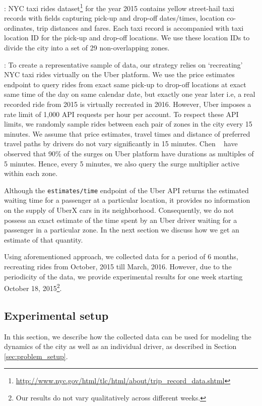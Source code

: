 :
NYC taxi rides dataset\footnote{\url{http://www.nyc.gov/html/tlc/html/about/trip_record_data.shtml}} for the year 2015 contains yellow street-hail taxi records with fields capturing pick-up and drop-off dates/times, location co-ordinates, trip distances and fares. Each taxi record is accompanied with taxi location ID for the pick-up and drop-off locations. We use these location IDs to divide the city into a set of 29 non-overlapping zones.

:
To create a representative sample of data, our strategy relies on `recreating' NYC taxi rides virtually on the Uber platform. We use the price estimates endpoint to query rides from exact same pick-up to drop-off locations at exact same time of the day on same calendar date, but exactly one year later i.e, a real recorded ride from 2015 is virtually recreated in 2016. However, Uber imposes a rate limit of 1,000 API requests per hour per account. To respect these API limits, we randomly sample rides between each pair of zones in the city every 15 minutes. We assume that price estimates, travel times and distance of preferred travel paths by drivers do not vary significantly in 15 minutes. Chen {\etal}~\cite{chen2015peeking} have observed that 90\% of the surges on Uber platform have durations as multiples of 5 minutes. Hence, every 5 minutes, we also query the surge multiplier active within each zone.

Although the \texttt{estimates/time} endpoint of the Uber API returns the estimated waiting time for a passenger at a particular location, it provides no information on the supply of UberX cars in its neighborhood. Consequently, we do not possess an exact estimate of the time spent by an Uber driver waiting for a passenger in a particular zone. 
In the next section we discuss how we get an estimate of that quantity.
%

Using aforementioned approach, we collected data for a period of 6 months, recreating rides from October, 2015 till March, 2016. However, due to the periodicity of the data, we provide experimental results for one week starting October 18, 2015\footnote{Our results do not vary qualitatively across different weeks.}.

\subsection{Experimental setup}
In this section, we describe how the collected data can be used for modeling the dynamics of the city as well as an individual driver, as described in Section \ref{sec:problem_setup}.


